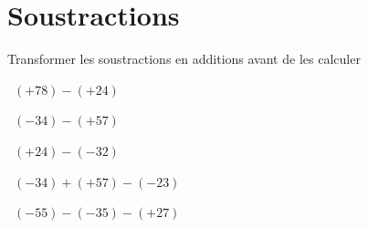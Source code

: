 \section{Soustractions}

Transformer les soustractions en additions avant de les calculer
\begin{questions}
	
	
	
	
	\question[2]  $(+78) - (+24)$
	\fillwithdottedlines{2cm}
	\begin{solution}
		
	\end{solution}

	
	\question[2]  $(-34) - (+57)$
	\fillwithdottedlines{2cm}
	\begin{solution}
		
	\end{solution}	

	\question[2]  $(+24) - (-32)$
	\fillwithdottedlines{2cm}
	\begin{solution}
		
	\end{solution}	
		
	\question[2]  $(-34) + (+57) - (-23) $
	\fillwithdottedlines{2cm}
	\begin{solution}
		
	\end{solution}

	\question[2]  $(-55) - (-35) - (+27) $
	\fillwithdottedlines{2cm}
	\begin{solution}
		
	\end{solution}

	
	
	
\end{questions}